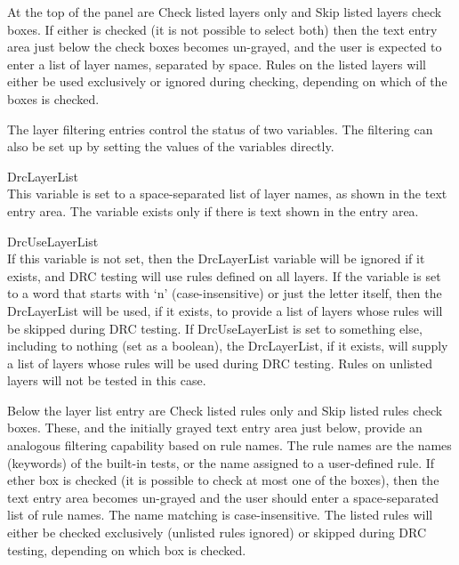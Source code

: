 At the top of the panel are {\cb Check listed layers only} and {\cb
Skip listed layers} check boxes.  If either is checked (it is not
possible to select both) then the text entry area just below the check
boxes becomes un-grayed, and the user is expected to enter a list of
layer names, separated by space.  Rules on the listed layers will
either be used exclusively or ignored during checking, depending on
which of the boxes is checked.

The layer filtering entries control the status of two variables.  The
filtering can also be set up by setting the values of the variables
directly.

\begin{description}
\item{\et DrcLayerList}\\
This variable is set to a space-separated list of layer names, as
shown in the text entry area.  The variable exists only if there is
text shown in the entry area.

\item{\et DrcUseLayerList}\\
If this variable is not set, then the {\et DrcLayerList} variable will
be ignored if it exists, and DRC testing will use rules defined on all
layers.  If the variable is set to a word that starts with `{\vt n}'
(case-insensitive) or just the letter itself, then the {\et
DrcLayerList} will be used, if it exists, to provide a list of layers
whose rules will be skipped during DRC testing.  If {\et
DrcUseLayerList} is set to something else, including to nothing (set
as a boolean), the {\et DrcLayerList}, if it exists, will supply a
list of layers whose rules will be used during DRC testing.  Rules on
unlisted layers will not be tested in this case.
\end{description}

Below the layer list entry are {\cb Check listed rules only} and {\cb
Skip listed rules} check boxes.  These, and the initially grayed text
entry area just below, provide an analogous filtering capability based
on rule names.  The rule names are the names (keywords) of the
built-in tests, or the name assigned to a user-defined rule.  If ether
box is checked (it is possible to check at most one of the boxes),
then the text entry area becomes un-grayed and the user should enter a
space-separated list of rule names.  The name matching is
case-insensitive.  The listed rules will either be checked exclusively
(unlisted rules ignored) or skipped during DRC testing, depending on
which box is checked.

